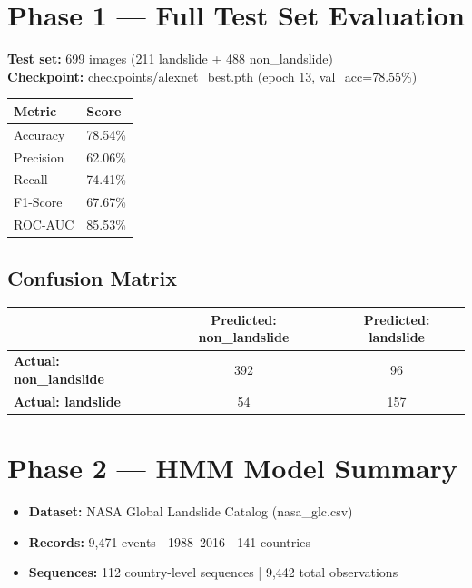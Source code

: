 \documentclass[11pt]{article}
\begin{document}
\section{Phase 1 — Full Test Set Evaluation}

\noindent \textbf{Test set:} 699 images (211 landslide + 488 non\_landslide) \\
\textbf{Checkpoint:} checkpoints/alexnet\_best.pth (epoch 13, val\_acc=78.55\%) \\

\vspace{0.3cm}
\begin{table}[h]
    \centering
    \begin{tabular}{@{}ll@{}}
        \toprule
        \textbf{Metric} & \textbf{Score} \\ \midrule
        Accuracy & 78.54\% \\
        Precision & 62.06\% \\
        Recall & 74.41\% \\
        F1-Score & 67.67\% \\
        ROC-AUC & 85.53\% \\ \bottomrule
    \end{tabular}
\end{table}

\subsection{Confusion Matrix}
\begin{table}[h]
    \centering
    \begin{tabular}{@{}lcc@{}}
        \toprule
        & \textbf{Predicted: non\_landslide} & \textbf{Predicted: landslide} \\ \midrule
        \textbf{Actual: non\_landslide} & 392 & 96 \\
        \textbf{Actual: landslide} & 54 & 157 \\ \bottomrule
    \end{tabular}
\end{table}

\section{Phase 2 — HMM Model Summary}

\begin{itemize}
    \item \textbf{Dataset:} NASA Global Landslide Catalog (nasa\_glc.csv)
    \item \textbf{Records:} 9,471 events | 1988–2016 | 141 countries
    \item \textbf{Sequences:} 112 country-level sequences | 9,442 total observations
\end{itemize}
\end{document}
